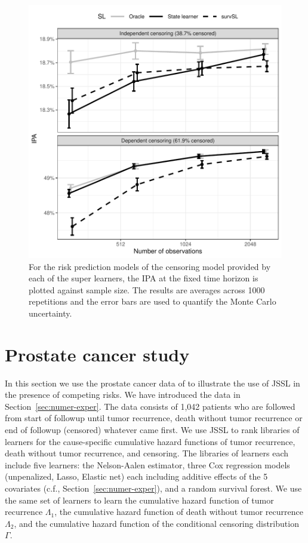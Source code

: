 \documentclass[a4paper,danish]{article}
\theoremstyle{plain} %
\numberwithin{theorem}{section}
\theoremstyle{definition} %
\theoremstyle{remark}
\newcommand{\1}{\mathds{1}}
\begin{document}
\begin{figure}
  \centering %
  \includegraphics[width=.7\linewidth]{experiment-fig-sl-survSL-cens.pdf}
  \caption[]{For the risk prediction models of the censoring model provided by
    each of the super learners, the IPA at the fixed time horizon is plotted
    against sample size. The results are averages across 1000 repetitions and
    the error bars are used to quantify the Monte Carlo uncertainty.}
  \label{fig:zelefski-cens}
\end{figure}


\section{Prostate cancer study}
\label{sec:real-data-appl}

In this section we use the prostate cancer data of
\cite{kattan2000pretreatment} to illustrate the use of JSSL in the presence of competing risks. We have
introduced the data in Section~\ref{sec:numer-exper}. The data
consists of 1,042 patients who are followed from start of
followup until tumor recurrence, death without tumor
recurrence or end of followup (censored) whatever came first.
We use JSSL to rank libraries of learners for the
cause-specific cumulative hazard functions of tumor
recurrence, death without tumor recurrence, and censoring. The
libraries of learners each include five learners: the
Nelson-Aalen estimator, three Cox regression models
(unpenalized, Lasso, Elastic net) each including additive
effects of the 5 covariates (c.f., Section~\ref{sec:numer-exper}),
and a random survival forest. We use the same set of learners
to learn the cumulative hazard function of tumor recurrence
\( \Lambda_1 \), the cumulative hazard function of death
without tumor recurrence \( \Lambda_2 \), and the cumulative
hazard function of the conditional censoring distribution
$\Gamma$.
\end{document}
